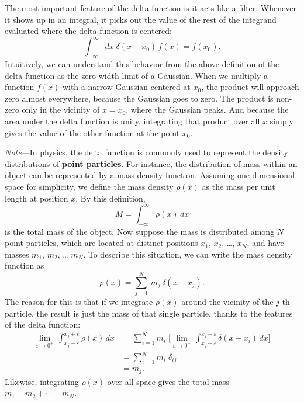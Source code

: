 \documentclass[10pt,a4paper]{article}
\begin{document}
The most important feature of the delta function is it acts like a
filter. Whenever it shows up in an integral, it picks out the value of
the rest of the integrand evaluated where the delta function is
centered:
\begin{equation}
\int_{-\infty}^\infty  dx \; \delta(x-x_0)\, f(x) = f(x_0).
\end{equation}
Intuitively, we can understand this behavior from the above definition
of the delta function as the zero-width limit of a Gaussian. When we
multiply a function $f(x)$ with a narrow Gaussian centered at $x_0$,
the product will approach zero almost everywhere, because the Gaussian
goes to zero. The product is non-zero only in the vicinity of
$x = x_0$, where the Gaussian peaks. And because the area under the
delta function is unity, integrating that product over all $x$ simply
gives the value of the other function at the point $x_0$.

\begin{framed}\noindent
  \textit{Note}---In physics, the delta function is commonly used to
  represent the density distributions of \textbf{point particles}. For
  instance, the distribution of mass within an object can be
  represented by a mass density function. Assuming one-dimensional
  space for simplicity, we define the mass density $\rho(x)$ as the
  mass per unit length at position $x$. By this
  definition,
  \begin{equation}
    M = \int_{-\infty}^\infty \rho(x)\, dx
  \end{equation}
  is the total mass of the object. Now suppose the mass is distributed
  among $N$ point particles, which are located at distinct positions
  $x_1$, $x_2$, \ldots, $x_N$, and have masses $m_1$, $m_2$, \ldots{}
  $m_N$. To describe this situation, we can write the mass density
  function as
  \begin{equation}
    \rho(x) = \sum_{j=1}^N \, m_j\, \delta(x-x_j).
  \end{equation}
  The reason for this is that if we integrate $\rho(x)$ around the
  vicinity of the $j$-th particle, the result is just the mass of that
  single particle, thanks to the features of the delta
  function:
  \begin{align}
    \lim_{\varepsilon\rightarrow 0^+}\, \int_{x_j - \varepsilon}^{x_j + \varepsilon} \rho(x) \, dx
    &= \sum_{i=1}^N m_i\; \Big[\lim_{\varepsilon\rightarrow 0^+}\, \int_{x_j - \varepsilon}^{x_j + \varepsilon} \delta(x-x_i) \,dx\Big]\\
    &= \sum_{i=1}^N m_i\; \delta_{ij} \\
    &= m_j.
  \end{align}
  Likewise, integrating $\rho(x)$ over all space gives the total mass
  $m_1 + m_2 + \cdots + m_N$.
\end{framed}
\end{document}
